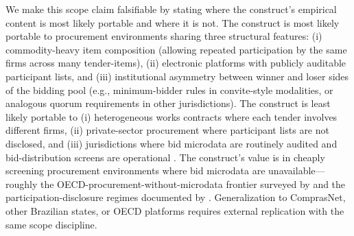 We make this scope claim falsifiable by stating where the
construct's empirical content is most likely portable and where
it is not. The construct is most likely portable to procurement
environments sharing three structural features: (i) commodity-heavy
item composition (allowing repeated participation by the same
firms across many tender-items), (ii) electronic platforms with
publicly auditable participant lists, and (iii) institutional
asymmetry between winner and loser sides of the bidding pool
(e.g., minimum-bidder rules in convite-style modalities, or
analogous quorum requirements in other jurisdictions). The
construct is least likely portable to (i) heterogeneous works
contracts where each tender involves different firms, (ii)
private-sector procurement where participant lists are not
disclosed, and (iii) jurisdictions where bid microdata are
routinely audited and bid-distribution screens are operational
\citep{imhof2019detecting,wallimann2023machine}. The construct's
value is in cheaply screening procurement environments where
bid microdata are unavailable---roughly the OECD-procurement-without-microdata
frontier surveyed by \citet{coviello2017tenure} and the
participation-disclosure regimes documented by
\citet{decarolis2020rules}. Generalization to ComprasNet, other
Brazilian states, or OECD platforms requires external
replication with the same scope discipline.


